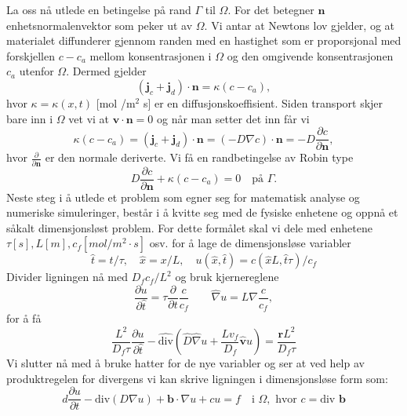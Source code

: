 La oss nå utlede en betingelse på rand \(\Gamma\) til \(\Omega\). For det betegner \(\mathbf{n}\) enhetsnormalenvektor som peker ut av \(\Omega\). Vi antar at Newtons lov gjelder, og at materialet diffunderer gjennom randen med en hastighet som er proporsjonal med forskjellen \( c - c_a \) mellom konsentrasjonen i \( \Omega \) og den omgivende konsentrasjonen \( c_a \) utenfor \( \Omega \). Dermed gjelder
\[
(\mathbf{j}_c + \mathbf{j}_d) \cdot \mathbf{n} = \kappa (c - c_a),
\]
hvor \( \kappa = \kappa(x, t) \) [mol /m\(^2\) s] er en diffusjonskoeffisient. 
Siden transport skjer bare inn i \(\Omega\) vet vi at \(\mathbf{v} \cdot \mathbf{n} =0\) og når man setter det inn får vi 
\[\kappa (c-c_a) =(\mathbf{j}_c + \mathbf{j}_d)\cdot \mathbf{n}= (-D\nabla c) \cdot \mathbf{n}=-D\frac{\partial c}{\partial \mathbf{n}},\]
hvor \(\frac{\partial}{\partial \mathbf{n}}\) er den normale deriverte. Vi få en randbetingelse av Robin type 
\[
D \frac{\partial c}{\partial \mathbf{n}} + \kappa(c - c_a) = 0 \quad \text{på } \Gamma.
\]
Neste steg i å utlede et problem som egner seg for matematisk analyse og numeriske simuleringer, består i å kvitte seg med de fysiske enhetene og oppnå et såkalt dimensjonsløst problem. For dette formålet skal vi dele med enhetene \(\tau [s], L [m], c_f [mol/m^2 \cdot s]\) osv. for å lage de dimensjonsløse variabler
\[\hat{t}=t/\tau, \quad \hat{x} = x/L, \quad u(\hat{x},\hat{t}) = c(\hat{x}L,\hat{t}\tau)/c_f\]
Divider ligningen nå med \(D_f c_f /L^2\) og bruk kjernereglene
\[\frac{\partial u}{\partial \hat{t}} = \tau \frac{\partial }{\partial t} \frac{c}{c_f} \qquad \hat{\nabla}u = L \nabla \frac{c}{c_f},\]
for å få
\[\frac{L^2}{D_f \tau} \frac{\partial u}{\partial \hat{t}} - \hat{\text{div}} (\hat{D} \hat{\nabla} u +\frac{Lv_f}{D_f} \hat{\mathbf{v}}u) = \frac{\mathbf{r}L^2}{D_f \tau}\]
Vi slutter nå med å bruke hatter for de nye variabler og ser at ved help av produktregelen for divergens vi kan skrive ligningen i dimensjonsløse form som:
\[
d\frac{\partial u}{\partial t} - \text{div} (D \nabla u) + \mathbf{b}\cdot \nabla u + cu = f \quad \text{i } \Omega, \text{ hvor } c= \text{div }\mathbf{b}
\]

